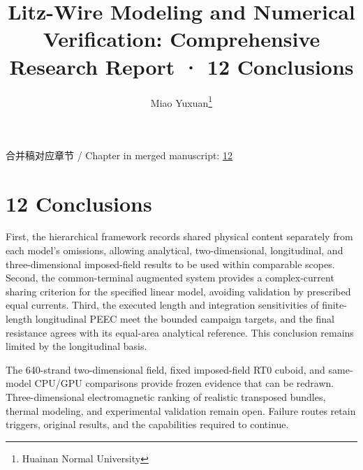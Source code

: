 \documentclass[journal,10pt]{IEEEtran}
\begin{document}
\title{Litz-Wire Modeling and Numerical Verification: Comprehensive Research Report · 12 Conclusions}
\author{Miao Yuxuan\thanks{Huainan Normal University}}

\maketitle
\noindent 合并稿对应章节 / Chapter in merged manuscript: \href{report_en_ieee.pdf#chapter-12}{12}\par
\FloatBarrier
\section*{12 Conclusions}
\hypertarget{chapter-12}{}
First, the hierarchical framework records shared physical content separately from each model’s omissions, allowing analytical, two-dimensional, longitudinal, and three-dimensional imposed-field results to be used within comparable scopes. Second, the common-terminal augmented system provides a complex-current sharing criterion for the specified linear model, avoiding validation by prescribed equal currents. Third, the executed length and integration sensitivities of finite-length longitudinal PEEC meet the bounded campaign targets, and the final resistance agrees with its equal-area analytical reference. This conclusion remains limited by the longitudinal basis.


The 640-strand two-dimensional field, fixed imposed-field RT0 cuboid, and same-model CPU/GPU comparisons provide frozen evidence that can be redrawn. Three-dimensional electromagnetic ranking of realistic transposed bundles, thermal modeling, and experimental validation remain open. Failure routes retain triggers, original results, and the capabilities required to continue.
\end{document}
